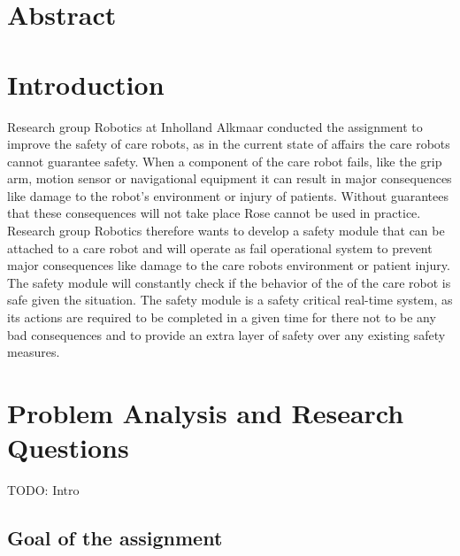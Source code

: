 \documentclass[12pt]{scrreprt}
\begin{document}
\chapter*{Abstract}
\tableofcontents
\newpage
{}

\chapter{Introduction}
\label{Introduction}
Research group Robotics at Inholland Alkmaar conducted the assignment to improve the safety of care robots, as in the current state of affairs the care robots cannot guarantee safety. When a component of the care robot fails, like the grip arm, motion sensor or navigational equipment it can result in major consequences like damage to the robot's environment or injury of patients. Without guarantees that these consequences will not take place Rose cannot be used in practice. Research group Robotics therefore wants to develop a safety module that can be attached to a care robot and will operate as fail operational system to prevent major consequences like damage to the care robots environment or patient injury. The safety module will constantly check if the behavior of the of the care robot is safe given the situation. The safety module is a safety critical real-time system, as its actions are required to be completed in a given time for there not to be any bad consequences and to provide an extra layer of safety over any existing safety measures.


\chapter{Problem Analysis and Research Questions}
TODO: Intro


\section{Goal of the assignment}
\label{Goal of the assignment}
\end{document}
